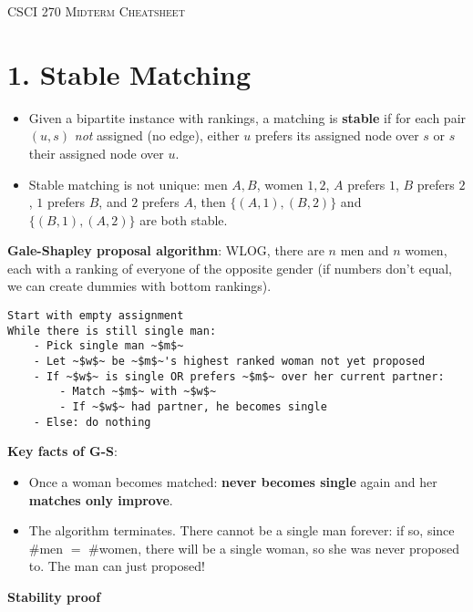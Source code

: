 \documentclass{memoir}
\begin{document}

\begin{multicols*}{3}
\setlength{\parindent}{0pt}
\setlength\multicolsep{1cm}

\textsc{CSCI 270 Midterm Cheatsheet}

\scriptsize

\section*{1. Stable Matching}

\begin{itemize}
		\item Given a bipartite instance with rankings, a matching is \textbf{stable} if for each pair $(u,s)$ \textit{not} assigned (no edge), either $u$ prefers its assigned node over $s$ or $s$ their assigned node over $u$. 
		\item Stable matching is not unique: men $A,B$, women $1,2$, $A$ prefers $1$, $B$ prefers $2$, $1$ prefers $B$, and $2$ prefers $A$, then $\{(A,1), (B,2)\}$ and $\{(B,1), (A,2)\}$ are both stable.
\end{itemize}


\textbf{Gale-Shapley proposal algorithm}: WLOG, there are $n$ men and $n$ women, each with a ranking of everyone of the opposite gender (if numbers don't equal, we can create dummies with bottom rankings).
\begin{lstlisting}[basicstyle=\fontsize{7}{8}\selectfont\ttfamily]
Start with empty assignment 
While there is still single man:
	- Pick single man ~$m$~
	- Let ~$w$~ be ~$m$~'s highest ranked woman not yet proposed
	- If ~$w$~ is single OR prefers ~$m$~ over her current partner:
		- Match ~$m$~ with ~$w$~
		- If ~$w$~ had partner, he becomes single
	- Else: do nothing
\end{lstlisting}

\textbf{Key facts of G-S}:
\begin{itemize}
		\item Once a woman becomes matched: \textbf{never becomes single} again and her \textbf{matches only improve}.
		\item The algorithm terminates. There cannot be a single man forever: if so, since \#men $=$ \#women, there will be a single woman, so she was never proposed to. The man can just proposed!
\end{itemize}

\textbf{Stability proof}


\end{multicols*}
\end{document}
